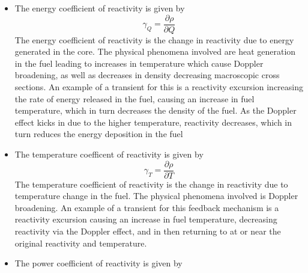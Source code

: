 \documentclass[11pt,addpoints,answers]{exam}
\begin{document}
\begin{questions}
        \begin{solution}
            \begin{itemize}
                \item The energy coefficient of reactivity is given by
                    \begin{equation}
                        \gamma_{Q} = \frac{\partial \rho}{\partial Q}
                    \end{equation}
                    The energy coefficient of reactivity is the
                    change in reactivity due to energy generated in the core.
                    The physical phenomena involved are heat
                    generation in the fuel leading to increases in temperature
                    which cause Doppler broadening, as well as decreases in
                    density decreasing macroscopic cross sections. An example of
                    a transient for this is a reactivity excursion increasing
                    the rate of energy released in the fuel, causing an
                    increase in fuel temperature, which in turn decreases the
                    density of the fuel. As the Doppler effect kicks in due to
                    the higher temperature, reactivity decreases, which in turn
                    reduces the energy deposition in the fuel
                \item The temperature coefficent of reactivity is given by
                    \begin{equation}
                        \gamma_{T} = \frac{\partial \rho}{\partial T}
                    \end{equation}
                    The temperature coefficient of reactivity is the change in
                    reactivity due to temperature change in the fuel. The
                    physical phenomena involved is Doppler broadening. An
                    example of a transient for this feedback mechanism is a
                    reactivity excursion causing an increase in fuel
                    temperature, decreasing reactivity via the Doppler effect,
                    and in then returning to at or near the original reactivity
                    and temperature.
                \item The power  coefficient of reactivity is given by

\end{itemize}
\end{solution}
\end{questions}
\end{document}
